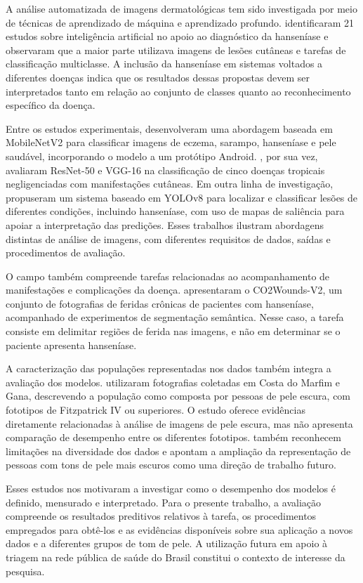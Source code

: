 A análise automatizada de imagens dermatológicas tem sido investigada
por meio de técnicas de aprendizado de máquina e aprendizado profundo.
 identificaram 21 estudos sobre inteligência
artificial no apoio ao diagnóstico da hanseníase e observaram que a
maior parte utilizava imagens de lesões cutâneas e tarefas de
classificação multiclasse. A inclusão da hanseníase em sistemas voltados
a diferentes doenças indica que os resultados dessas propostas devem ser
interpretados tanto em relação ao conjunto de classes quanto ao
reconhecimento específico da doença.

Entre os estudos experimentais, 
desenvolveram uma abordagem baseada em MobileNetV2 para classificar
imagens de eczema, sarampo, hanseníase e pele saudável, incorporando o
modelo a um protótipo Android. , por sua vez,
avaliaram ResNet-50 e VGG-16 na classificação de cinco doenças tropicais
negligenciadas com manifestações cutâneas. Em outra linha de
investigação,  propuseram um sistema baseado em YOLOv8
para localizar e classificar lesões de diferentes condições, incluindo
hanseníase, com uso de mapas de saliência para apoiar a interpretação
das predições. Esses trabalhos ilustram abordagens distintas de análise
de imagens, com diferentes requisitos de dados, saídas e procedimentos
de avaliação.

O campo também compreende tarefas relacionadas ao acompanhamento de
manifestações e complicações da doença. 
apresentaram o CO2Wounds-V2, um conjunto de fotografias de feridas
crônicas de pacientes com hanseníase, acompanhado de experimentos de
segmentação semântica. Nesse caso, a tarefa consiste em delimitar
regiões de ferida nas imagens, e não em determinar se o paciente
apresenta hanseníase.

A caracterização das populações representadas nos dados também integra a
avaliação dos modelos.  utilizaram fotografias
coletadas em Costa do Marfim e Gana, descrevendo a população como
composta por pessoas de pele escura, com fototipos de Fitzpatrick IV ou
superiores. O estudo oferece evidências diretamente relacionadas à
análise de imagens de pele escura, mas não apresenta comparação de
desempenho entre os diferentes fototipos.  também
reconhecem limitações na diversidade dos dados e apontam a ampliação da
representação de pessoas com tons de pele mais escuros como uma direção
de trabalho futuro.

Esses estudos nos motivaram a investigar como o desempenho dos modelos é
definido, mensurado e interpretado. Para o presente trabalho, a
avaliação compreende os resultados preditivos relativos à tarefa, os
procedimentos empregados para obtê-los e as evidências disponíveis sobre
sua aplicação a novos dados e a diferentes grupos de tom de pele. A
utilização futura em apoio à triagem na rede pública de saúde do Brasil
constitui o contexto de interesse da pesquisa.

